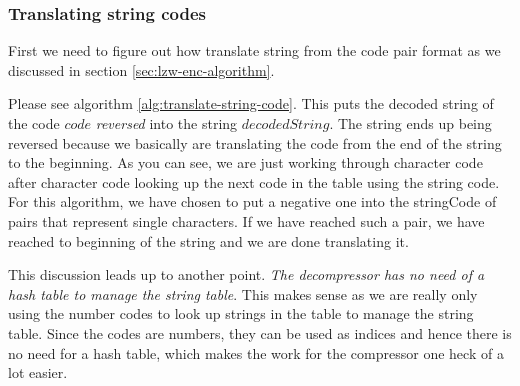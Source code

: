 \begin{refsection}
\begin{algorithm}[H]
\begin{algorithmic}[1]


       
      \Else
      \EndIf

      \State {}

       

      \State {}



    \EndWhile
  \end{algorithmic}
\end{algorithm}

\subsubsection{Translating string codes}

First we need to figure out how translate string from the code pair format as we
discussed in section \ref{sec:lzw-enc-algorithm}.

Please see algorithm \ref{alg:translate-string-code}. This puts the
decoded string of the code $code$ \textit{reversed} into the string
$decodedString$. The string ends up being reversed because we
basically are translating the code from the end of the string to the
beginning. As you can see, we are just working through character code
after character code looking up the next code in the table using the
string code. For this algorithm, we have chosen to put a negative one
into the stringCode of pairs that represent single characters. If we
have reached such a pair, we have reached to beginning of the string
and we are done translating it.

This discussion leads up to another point. \textit{The decompressor
  has no need of a hash table to manage the string table}. This makes sense as
we are really only using the number codes to look up strings in the
table to manage the string table. Since the codes are numbers, they
can be used as indices and hence there is no need for a hash table,
which makes the work for the compressor one heck of a lot easier.


\end{refsection}
